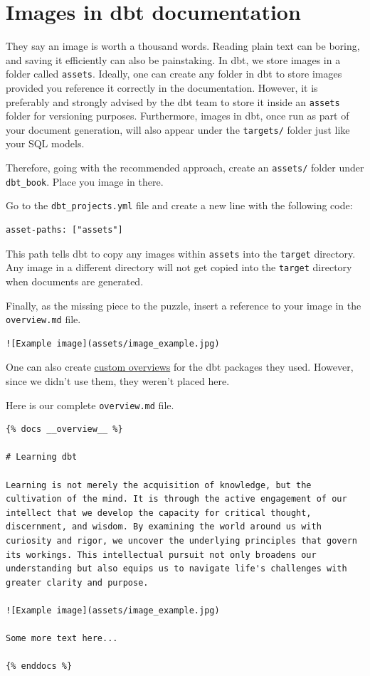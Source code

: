 \documentclass[
]{book}
\begin{document}
\hypertarget{images-in-dbt-documentation}{%
\section{Images in dbt documentation}\label{images-in-dbt-documentation}}

They say an image is worth a thousand words. Reading plain text can be boring, and saving it efficiently can also be painstaking. In dbt, we store images in a folder called \texttt{assets}. Ideally, one can create any folder in dbt to store images provided you reference it correctly in the documentation. However, it is preferably and strongly advised by the dbt team to store it inside an \texttt{assets} folder for versioning purposes. Furthermore, images in dbt, once run as part of your document generation, will also appear under the \texttt{targets/} folder just like your SQL models.

Therefore, going with the recommended approach, create an \texttt{assets/} folder under \texttt{dbt\_book}. Place you image in there.

Go to the \texttt{dbt\_projects.yml} file and create a new line with the following code:

\begin{verbatim}
asset-paths: ["assets"]
\end{verbatim}

This path tells dbt to copy any images within \texttt{assets} into the \texttt{target} directory. Any image in a different directory will not get copied into the \texttt{target} directory when documents are generated.

Finally, as the missing piece to the puzzle, insert a reference to your image in the \texttt{overview.md} file.

\begin{verbatim}
![Example image](assets/image_example.jpg)
\end{verbatim}

One can also create \href{https://docs.getdbt.com/docs/build/documentation\#setting-a-custom-overview}{custom overviews} for the dbt packages they used. However, since we didn't use them, they weren't placed here.

Here is our complete \texttt{overview.md} file.

\begin{verbatim}
{% docs __overview__ %}

# Learning dbt

Learning is not merely the acquisition of knowledge, but the cultivation of the mind. It is through the active engagement of our intellect that we develop the capacity for critical thought, discernment, and wisdom. By examining the world around us with curiosity and rigor, we uncover the underlying principles that govern its workings. This intellectual pursuit not only broadens our understanding but also equips us to navigate life's challenges with greater clarity and purpose.

![Example image](assets/image_example.jpg)

Some more text here...

{% enddocs %}
\end{verbatim}
\end{document}
